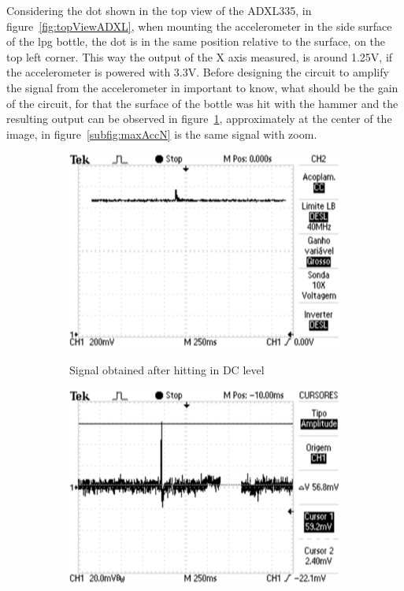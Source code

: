 Considering the dot shown in the top view of the ADXL335, in figure~\ref{fig:topViewADXL}, when mounting the accelerometer in the side surface of the \acrshort{lpg} bottle, the dot is in the same position relative to the surface, on the top left corner. This way the output of the X axis measured, is around 1.25V, if the accelerometer is powered with 3.3V. Before designing the circuit to amplify the signal from the accelerometer in important to know, what should be the gain of the circuit, for that the surface of the bottle was hit with the hammer and the resulting output can be observed in figure~\ref{subfig:maxAccNDC}, approximately at the center of the image, in figure~\ref{subfig:maxAccN} is the same signal with zoom.
\begin{figure}[]
    \centering
    \begin{subfigure}{0.45\textwidth}
        \centering
        \includegraphics[width=\linewidth]{Chapters/4CHP/Figures/maxAccNDC.eps}
        \caption{Signal obtained after hitting in DC level}{}
        \label{subfig:maxAccNDC}
    \end{subfigure}
    \begin{subfigure}{0.45\textwidth}
        \centering
        \includegraphics[width=\linewidth]{Chapters/4CHP/Figures/maxAccN.eps}

\end{subfigure}
\end{figure}
